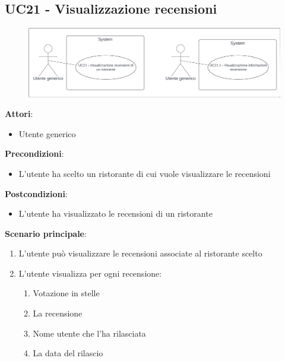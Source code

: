 \subsection{UC21 - Visualizzazione recensioni}\label{usecase:21}
\begin{figure}[H]
    \centering
    \includegraphics[width=0.9\linewidth]{ucd/ucd21.png}
\end{figure}
\textbf{Attori}:
\begin{itemize}
    \item Utente generico
\end{itemize}
\textbf{Precondizioni}:
\begin{itemize}
    \item L'utente ha scelto un ristorante di cui vuole visualizzare le recensioni
\end{itemize}
\textbf{Postcondizioni}:
\begin{itemize}
    \item L'utente ha visualizzato le recensioni di un ristorante
\end{itemize}
\textbf{Scenario principale}:
\begin{enumerate}
    \item L'utente può visualizzare le recensioni associate al ristorante scelto
    \item L'utente visualizza per ogni recensione:
    \begin{enumerate}
        \item Votazione in stelle
        \item La recensione
        \item Nome utente che l'ha rilasciata
        \item La data del rilascio
    \end{enumerate}
\end{enumerate}

\newpage

